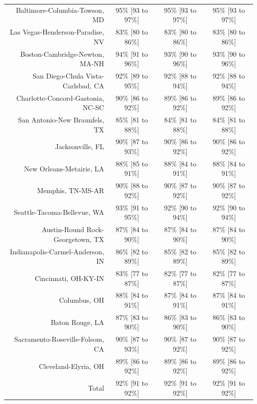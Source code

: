 \documentclass{article}
\begin{document}
\begin{table}[H]
\begin{tabular}{|r|c|c|c|}
		Baltimore-Columbia-Towson, MD & 95\% [93 to 97\%] & 95\% [93 to 97\%] & 95\% [93 to 97\%]\\
		Las Vegas-Henderson-Paradise, NV & 83\% [80 to 86\%] & 83\% [80 to 86\%] & 83\% [80 to 86\%]\\
		Boston-Cambridge-Newton, MA-NH & 94\% [91 to 96\%] & 93\% [90 to 96\%] & 93\% [90 to 96\%]\\
		San Diego-Chula Vista-Carlsbad, CA & 92\% [89 to 95\%] & 92\% [88 to 94\%] & 92\% [88 to 94\%]\\
		Charlotte-Concord-Gastonia, NC-SC & 90\% [86 to 92\%] & 89\% [86 to 92\%] & 89\% [86 to 92\%]\\
		San Antonio-New Braunfels, TX & 85\% [81 to 88\%] & 84\% [81 to 88\%] & 84\% [81 to 88\%]\\
		Jacksonville, FL & 90\% [87 to 93\%] & 90\% [86 to 92\%] & 90\% [86 to 92\%]\\
		New Orleans-Metairie, LA & 88\% [85 to 91\%] & 88\% [84 to 91\%] & 88\% [84 to 91\%]\\
		Memphis, TN-MS-AR & 90\% [88 to 92\%] & 90\% [87 to 92\%] & 90\% [87 to 92\%]\\
		Seattle-Tacoma-Bellevue, WA & 93\% [91 to 95\%] & 92\% [90 to 94\%] & 92\% [90 to 94\%]\\
		Austin-Round Rock-Georgetown, TX & 87\% [84 to 90\%] & 87\% [84 to 90\%] & 87\% [84 to 90\%]\\
		Indianapolis-Carmel-Anderson, IN & 86\% [82 to 89\%] & 85\% [82 to 89\%] & 85\% [82 to 89\%]\\
		Cincinnati, OH-KY-IN & 83\% [77 to 87\%] & 82\% [77 to 87\%] & 82\% [77 to 87\%]\\
		Columbus, OH & 88\% [84 to 91\%] & 87\% [84 to 91\%] & 87\% [84 to 91\%]\\
		Baton Rouge, LA & 87\% [83 to 90\%] & 86\% [83 to 90\%] & 86\% [83 to 90\%]\\
		Sacramento-Roseville-Folsom, CA & 90\% [87 to 93\%] & 90\% [87 to 92\%] & 90\% [87 to 92\%]\\
		Cleveland-Elyria, OH & 89\% [86 to 92\%] & 89\% [86 to 92\%] & 89\% [86 to 92\%]\\
		\hline
		Total & 92\% [91 to 92\%] & 92\% [91 to 92\%] & 92\% [91 to 92\%]\\
		\hline
	\end{tabular}
\end{table}
\end{document}
